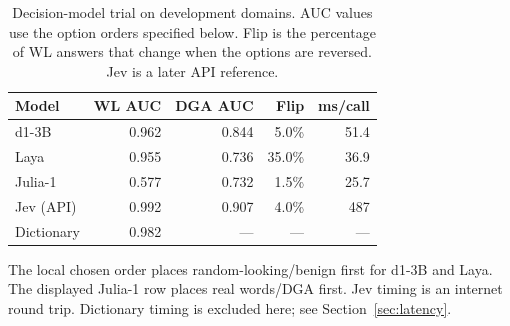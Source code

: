 \begin{table}[!t]
\caption{Decision-model trial on development domains. AUC values use the option orders specified below. Flip is the percentage of WL answers that change when the options are reversed. Jev is a later API reference.}
\label{tab:decision-trial}
\centering\footnotesize
\setlength{\tabcolsep}{3.2pt}
\begin{tabular}{@{}lrrrr@{}}
\toprule
Model & WL AUC & DGA AUC & Flip & ms/call \\
\midrule
d1-3B & 0.962 & 0.844 & 5.0\% & 51.4 \\
Laya & 0.955 & 0.736 & 35.0\% & 36.9 \\
Julia-1 & 0.577 & 0.732 & 1.5\% & 25.7 \\
Jev (API) & 0.992 & 0.907 & 4.0\% & 487 \\
Dictionary & 0.982 & --- & --- & --- \\
\bottomrule
\end{tabular}
\par\smallskip\begin{minipage}{\linewidth}\scriptsize The local chosen order places random-looking/benign first for d1-3B and Laya. The displayed Julia-1 row places real words/DGA first. Jev timing is an internet round trip. Dictionary timing is excluded here; see Section~\ref{sec:latency}.\end{minipage}
\end{table}

